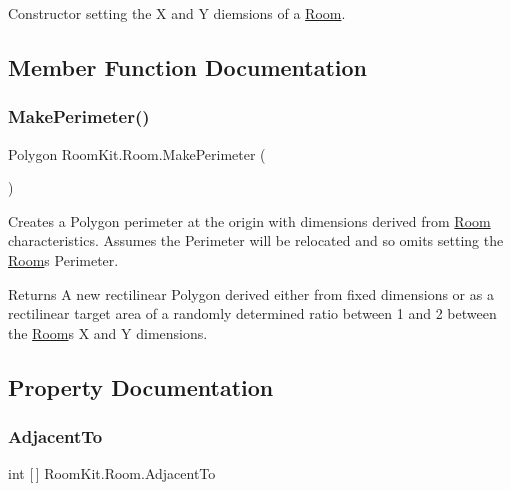 Constructor setting the X and Y diemsions of a \mbox{\hyperlink{class_room_kit_1_1_room}{Room}}. 



\subsection{Member Function Documentation}
\mbox{\label{class_room_kit_1_1_room_abe395580dc9617c4596b18e520111673}} 
\subsubsection{\texorpdfstring{Make\+Perimeter()}{MakePerimeter()}}
{\footnotesize\ttfamily Polygon Room\+Kit.\+Room.\+Make\+Perimeter (\begin{DoxyParamCaption}{ }\end{DoxyParamCaption})}



Creates a Polygon perimeter at the origin with dimensions derived from \mbox{\hyperlink{class_room_kit_1_1_room}{Room}} characteristics. Assumes the Perimeter will be relocated and so omits setting the \mbox{\hyperlink{class_room_kit_1_1_room}{Room}}\textquotesingle{}s Perimeter. 

\begin{DoxyReturn}{Returns}
A new rectilinear Polygon derived either from fixed dimensions or as a rectilinear target area of a randomly determined ratio between 1 and 2 between the \mbox{\hyperlink{class_room_kit_1_1_room}{Room}}\textquotesingle{}s X and Y dimensions. 
\end{DoxyReturn}


\subsection{Property Documentation}
\mbox{\label{class_room_kit_1_1_room_a9a0ed1a4011c3759f5e39a97d4e7e986}} 
\subsubsection{\texorpdfstring{Adjacent\+To}{AdjacentTo}}
{\footnotesize\ttfamily int \mbox{[}$\,$\mbox{]} Room\+Kit.\+Room.\+Adjacent\+To\hspace{0.3cm}{\ttfamily [get]}}



